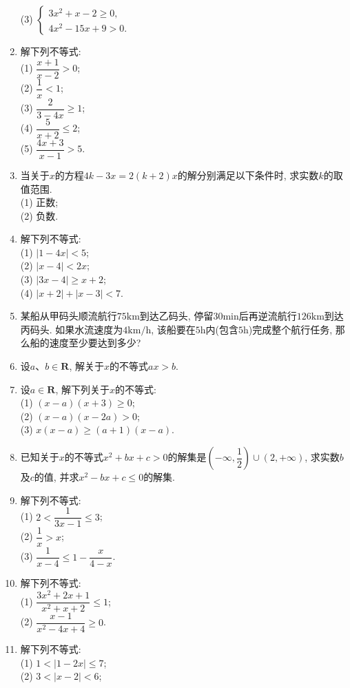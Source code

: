 \documentclass[10pt,a4paper]{article}
\begin{document}
\begin{enumerate}[1.]
(3) $\begin{cases} 3x^2+x-2\ge 0, \\ 4x^2-15x+9>0. \end{cases}$
\item 解下列不等式:\\
(1) $\dfrac{x+1}{x-2}>0$;\\
(2) $\dfrac 1x<1$;\\
(3) $\dfrac 2{3-4x}\ge 1$;\\
(4) $\dfrac 5{x+2}\le 2$;\\
(5) $\dfrac{4x+3}{x-1}>5$.
\item 当关于$x$的方程$4k-3x=2(k+2)x$的解分别满足以下条件时, 求实数$k$的取值范围.\\
(1) 正数;\\
(2) 负数.
\item 解下列不等式:\\
(1) $|1-4x|<5$;\\
(2) $|x-4|<2x$;\\
(3) $|3x-4|\ge x+2$;\\
(4) $|x+2|+|x-3|<7$.
\item 某船从甲码头顺流航行$75\text{km}$到达乙码头, 停留$30\text{min}$后再逆流航行$126\text{km}$到达丙码头. 如果水流速度为$4\text{km}/\text{h}$, 该船要在$5\text{h}$内(包含$5\text{h}$)完成整个航行任务, 那么船的速度至少要达到多少?
\item 设$a$、$b\in \mathbf{R}$, 解关于$x$的不等式$ax>b$.
\item 设$a\in \mathbf{R}$, 解下列关于$x$的不等式:\\
(1) $(x-a)(x+3)\ge 0$;\\
(2) $(x-a)(x-2a)>0$;\\
(3) $x(x-a)\ge (a+1)(x-a)$.
\item 已知关于$x$的不等式$x^2+bx+c>0$的解集是$(-\infty, \dfrac 12)\cup(2, +\infty)$, 求实数$b$及$c$的值, 并求$x^2-bx+c\le 0$的解集.
\item 解下列不等式:\\
(1) $2< \dfrac 1{3x-1}\le 3$;\\
(2) $\dfrac 1x>x$;\\
(3) $\dfrac 1{x-4}\le 1- \dfrac x{4-x}$.
\item 解下列不等式:\\
(1) $ \dfrac{3x^2+2x+1}{x^2+x+2}\le 1$;\\
(2) $\dfrac{x-1}{x^2-4x+4}\ge 0$.
\item 解下列不等式:\\
(1) $1<|1-2x| \le 7$;\\
(2) $3<|x-2|<6$;\\

\end{enumerate}
\end{document}
